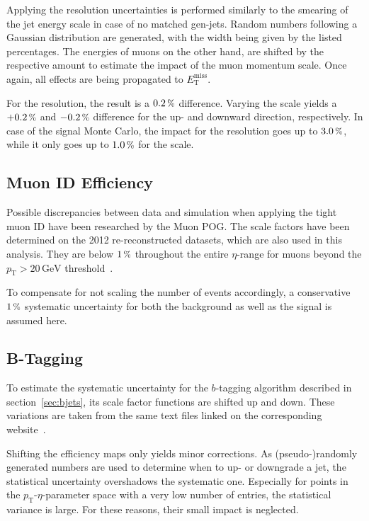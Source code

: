 Applying the resolution uncertainties is performed similarly to the smearing of the jet energy scale in case of no matched gen-jets. Random numbers following a Gaussian distribution are generated, with the width being given by the listed percentages. The energies of muons on the other hand, are shifted by the respective amount to estimate the impact of the muon momentum scale. Once again, all effects are being propagated to $E_{\text{T}}^{\text{miss}}$.

For the resolution, the result is a $0.2\,\pct$ difference. Varying the scale yields a $+0.2\,\pct$ and $-0.2\,\pct$ difference for the up- and downward direction, respectively. In case of the signal Monte Carlo, the impact for the resolution goes up to $3.0\,\pct$, while it only goes up to $1.0\,\pct$ for the scale.


\subsection{Muon  ID Efficiency}
\label{sec:muonidsys}

Possible discrepancies between data and simulation when applying the tight muon ID have been researched by the Muon POG. The scale factors have been determined on the 2012 re-reconstructed datasets, which are also used in this analysis. They are below $1\,\pct$ throughout the entire $\eta$-range for muons beyond the $p_{\text{T}} > 20\,\text{GeV}$ threshold~\cite{muonideff}. 

To compensate for not scaling the number of events accordingly, a conservative $1\,\pct$ systematic uncertainty for both the background as well as the signal is assumed here.


\subsection{B-Tagging}
\label{sec:btagsys}

To estimate the systematic uncertainty for the $b$-tagging algorithm described in section~\ref{sec:bjets}, its scale factor functions are shifted up and down. These variations are taken from the same text files linked on the corresponding website~\cite{btagtwiki}.

Shifting the efficiency maps only yields minor corrections. As (pseudo-)randomly generated numbers are used to determine when to up- or downgrade a jet, the statistical uncertainty overshadows the systematic one. Especially for points in the $p_{\text{T}}$-$\eta$-parameter space with a very low number of entries, the statistical variance is large. For these reasons, their small impact is neglected.

